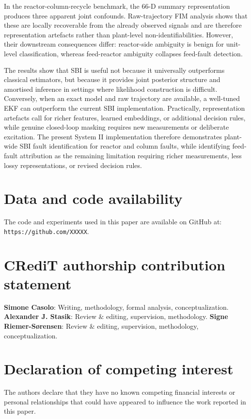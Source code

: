 \documentclass[aps,pre,twocolumn,superscriptaddress,floatfix]{revtex4-2}
\begin{document}
In the reactor-column-recycle benchmark, the 66-D summary representation produces three
apparent joint confounds. Raw-trajectory FIM analysis shows that these are locally 
recoverable from the already observed signals and are therefore representation artefacts 
rather than plant-level non-identifiabilities. However, their downstream consequences differ:
reactor-side ambiguity is benign for unit-level classification, whereas feed-reactor ambiguity
collapses feed-fault detection.

The results show that SBI is useful not because it universally outperforms classical
estimators, but because it provides joint posterior structure and amortised inference
in settings where likelihood construction is difficult. Conversely, when an exact model
and raw trajectory are available, a well-tuned EKF can outperform the current SBI
implementation. Practically, representation artefacts call for richer features, learned
embeddings, or additional decision rules, while genuine closed-loop masking requires new
measurements or deliberate excitation. The present System II implementation therefore
demonstrates plant-wide SBI fault identification for reactor and column faults, while
identifying feed-fault attribution as the remaining limitation requiring richer
measurements, less lossy representations, or revised decision rules.


\section{Data and code availability}
The code and experiments used in this paper are available on GitHub
at: \nolinkurl{https://github.com/XXXXX}.\\

\section{CRediT authorship contribution statement}
\textbf{Simone Casolo}: Writing, methodology, formal analysis, conceptualization.
\textbf{Alexander J. Stasik}: Review $\&$ editing, supervision, methodology.
\textbf{Signe Riemer-S\o rensen}: Review $\&$ editing, supervision, methodology, conceptualization.\\

\section{Declaration of competing interest}
The authors declare that they have no known competing financial interests or personal relationships that could have appeared to influence the work reported in this paper.
\end{document}
